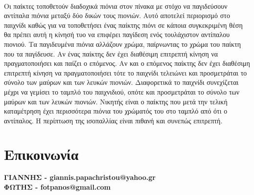 \documentclass[12pt]{article}
\begin{document}
\\Οι παίκτες τοποθετούν διαδοχικά πιόνια στον πίνακα με στόχο να παγιδεύσουν αντίπαλα πιόνια μεταξύ δύο δικών τους πιονιών. Αυτό αποτελεί περιορισμό στο παιχνίδι καθώς για να τοποθετήσει ένας παίκτης πιόνι σε κάποια συγκεκριμένη θέση θα πρέπει αυτή η κίνησή τυο να επιφέρει παγίδεση ενός τουλάχιστον αντίπαλου πιονιού. Τα παγιδευμένα πιόνια αλλάζουν χρώμα, παίρνωντας το χρώμα του παίκτη που τα παγίδευσε. Αν ένας παίκτης δεν έχει διαθέσιμη επιτρεπτή κίνηση να πραγματοποιήσει και παίζει ο επόμενος. Αν και ο επόμενος παίκτης δεν έχει διαθέσιμη επιτρεπτή κίνηση να πραγματοποιήσει τότε το παιχνίδι τελειώνει και προσμετράται το σύνολο των μαύρων και των λευκών πιονιών. Διαφορετικά το παιχνίδι συνεχίζεται μέχρι να γεμίσει το ταμπλό του παιχνιδιού, οπότε και προσμετράται το σύνολο των μαύρων και των λευκών πιονιών. Νικητής είναι ο παίκτης που μετά την τελική καταμέτρηση έχει περισσότερα πιόνια του χρώματός του στο ταμπλό από ότι ο αντίπαλος. Η περίπτωση της ισοπαλλίας είναι πιθανή και συνεπώς επιτρεπτή. 

\section{Επικοινωνία}


\begin{center}
    \textbf{ΓΙΑΝΝΗΣ - giannis.papachristou@yahoo.gr\\ ΦΩΤΗΣ - fotpanos@gmail.com}
    
\end{center}
\end{document}

